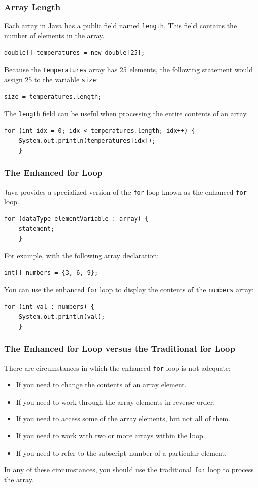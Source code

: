 \documentclass[11pt]{beamer}
\begin{document}
\begin{frame}[fragile]
    \frametitle{Array Length}
    Each array in Java has a public field named \texttt{length}. This field contains the number of elements in the array.
    \begin{lstlisting}[basicstyle=\ttfamily\footnotesize]
double[] temperatures = new double[25];
    \end{lstlisting}
    Because the \texttt{temperatures} array has 25 elements, the following statement would assign 25 to the variable \texttt{size}:
    \begin{lstlisting}[basicstyle=\ttfamily\footnotesize]
size = temperatures.length;
    \end{lstlisting}
    The \texttt{length} field can be useful when processing the entire contents of an array.
    \begin{lstlisting}[basicstyle=\ttfamily\footnotesize]
for (int idx = 0; idx < temperatures.length; idx++) {
    System.out.println(temperatures[idx]);
    }
    \end{lstlisting}
\end{frame}

\begin{frame}[fragile]
    \frametitle{The Enhanced for Loop}
    Java provides a specialized version of the \texttt{for} loop known as the enhanced \texttt{for} loop.
    \begin{lstlisting}[basicstyle=\ttfamily\footnotesize]
for (dataType elementVariable : array) {
    statement;
    }
    \end{lstlisting}
    For example, with the following array declaration:
    \begin{lstlisting}[basicstyle=\ttfamily\footnotesize]
int[] numbers = {3, 6, 9};
    \end{lstlisting}
    You can use the enhanced \texttt{for} loop to display the contents of the \texttt{numbers} array:
    \begin{lstlisting}[basicstyle=\ttfamily\footnotesize]
for (int val : numbers) {
    System.out.println(val);
    }
    \end{lstlisting}
\end{frame}

\begin{frame}[fragile]
    \frametitle{The Enhanced for Loop versus the Traditional for Loop}
    There are circumstances in which the enhanced \texttt{for} loop is not adequate:
    \begin{itemize}
        \item If you need to change the contents of an array element.
        \item If you need to work through the array elements in reverse order.
        \item If you need to access some of the array elements, but not all of them.
        \item If you need to work with two or more arrays within the loop.
        \item If you need to refer to the subscript number of a particular element.
    \end{itemize}
    In any of these circumstances, you should use the traditional \texttt{for} loop to process the array.
\end{frame}
\end{document}
